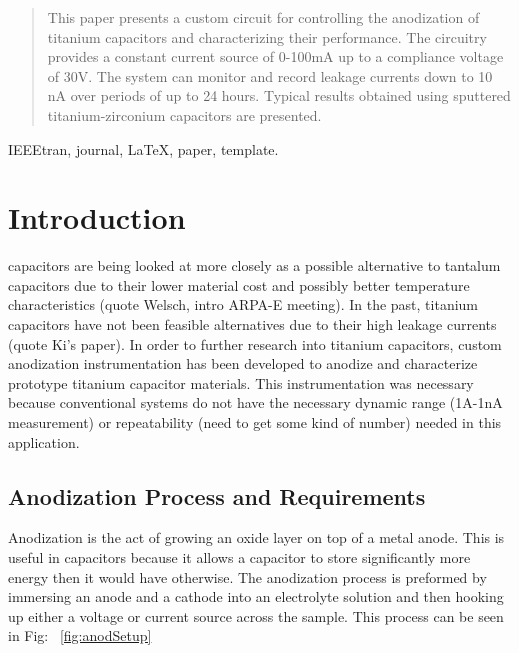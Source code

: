 \documentclass[journal]{./IEEEtran}
\begin{document}
\maketitle


\begin{abstract}
This paper presents a custom circuit for controlling the anodization of titanium capacitors and characterizing their performance. The circuitry provides a constant current source of 0-100mA up to a compliance voltage of 30V. The system can monitor and record leakage currents down to 10 nA over periods of up to 24 hours. Typical results obtained using sputtered titanium-zirconium capacitors are presented.
\end{abstract}

\begin{IEEEkeywords}
IEEEtran, journal, \LaTeX, paper, template.
\end{IEEEkeywords}

\IEEEpeerreviewmaketitle

\section{Introduction}
 capacitors are being looked at more closely as a possible alternative to tantalum capacitors due to their lower material cost and possibly better temperature characteristics (quote Welsch, intro ARPA-E meeting). In the past, titanium capacitors have not been feasible alternatives due to their high leakage currents (quote Ki’s paper). In order to further research into titanium capacitors, custom anodization instrumentation has been developed to anodize and characterize prototype titanium capacitor materials. This instrumentation was necessary because conventional systems do not have the necessary dynamic range (1A-1nA measurement) or repeatability (need to get some kind of number) needed in this application.


\subsection{Anodization Process and Requirements}

Anodization is the act of growing an oxide layer on top of a metal anode. This is useful in capacitors because it allows a capacitor to store significantly more energy then it would have otherwise. The anodization process is preformed by immersing an anode and a cathode into an electrolyte solution and then hooking up either a voltage or current source across the sample. This process can be seen in Fig:  ~\ref{fig:anodSetup}
\end{document}
